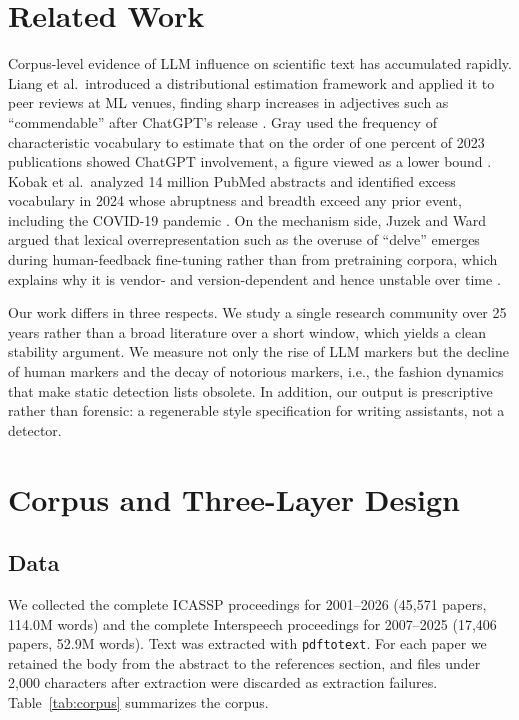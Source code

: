 \documentclass[a4paper,10pt,twocolumn]{article}
\begin{document}
\section{Related Work}

Corpus-level evidence of LLM influence on scientific text has accumulated rapidly. Liang et al.\ introduced a distributional estimation framework and applied it to peer reviews at ML venues, finding sharp increases in adjectives such as ``commendable'' after ChatGPT's release \cite{liang2024}. Gray used the frequency of characteristic vocabulary to estimate that on the order of one percent of 2023 publications showed ChatGPT involvement, a figure viewed as a lower bound \cite{gray2024}. Kobak et al.\ analyzed 14 million PubMed abstracts and identified excess vocabulary in 2024 whose abruptness and breadth exceed any prior event, including the COVID-19 pandemic \cite{kobak2024}. On the mechanism side, Juzek and Ward argued that lexical overrepresentation such as the overuse of ``delve'' emerges during human-feedback fine-tuning rather than from pretraining corpora, which explains why it is vendor- and version-dependent and hence unstable over time \cite{juzek2025}.

Our work differs in three respects. We study a single research community over 25 years rather than a broad literature over a short window, which yields a clean stability argument. We measure not only the rise of LLM markers but the decline of human markers and the decay of notorious markers, i.e., the fashion dynamics that make static detection lists obsolete. In addition, our output is prescriptive rather than forensic: a regenerable style specification for writing assistants, not a detector.

\section{Corpus and Three-Layer Design}

\subsection{Data}

We collected the complete ICASSP proceedings for 2001--2026 (45,571 papers, 114.0M words) and the complete Interspeech proceedings for 2007--2025 (17,406 papers, 52.9M words). Text was extracted with \texttt{pdftotext}. For each paper we retained the body from the abstract to the references section, and files under 2,000 characters after extraction were discarded as extraction failures. Table~\ref{tab:corpus} summarizes the corpus.
\end{document}
